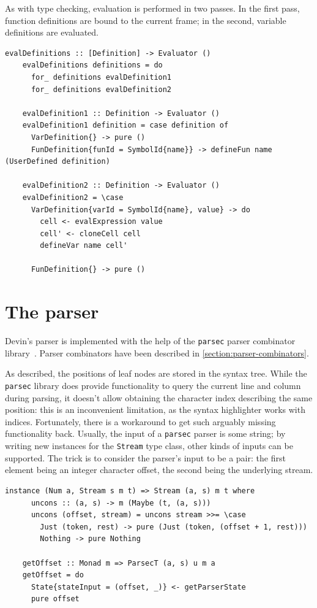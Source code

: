 \documentclass[UdineBachThesis,american,11pt]{PhdThesis}
\begin{document}
  As with type checking, evaluation is performed in two passes. In the first
  pass, function definitions are bound to the current frame; in the second,
  variable definitions are evaluated.

  \begin{Verbatim}[gobble=4,fontsize=\small]
    evalDefinitions :: [Definition] -> Evaluator ()
    evalDefinitions definitions = do
      for_ definitions evalDefinition1
      for_ definitions evalDefinition2

    evalDefinition1 :: Definition -> Evaluator ()
    evalDefinition1 definition = case definition of
      VarDefinition{} -> pure ()
      FunDefinition{funId = SymbolId{name}} -> defineFun name (UserDefined definition)

    evalDefinition2 :: Definition -> Evaluator ()
    evalDefinition2 = \case
      VarDefinition{varId = SymbolId{name}, value} -> do
        cell <- evalExpression value
        cell' <- cloneCell cell
        defineVar name cell'

      FunDefinition{} -> pure ()
  \end{Verbatim}

  \section{The parser}

  Devin's parser is implemented with the help of the \mbox{\texttt{parsec}}
  parser combinator library~\cite{parsec}. Parser combinators have been
  described in \autoref{section:parser-combinators}.

  As described, the positions of leaf nodes are stored in the syntax tree. While
  the \mbox{\texttt{parsec}} library does provide functionality to query the
  current line and column during parsing, it doesn't allow obtaining the
  character index describing the same position: this is an inconvenient
  limitation, as the syntax highlighter works with indices. Fortunately, there
  is a workaround to get such arguably missing functionality back. Usually, the
  input of a \mbox{\texttt{parsec}} parser is some string; by writing new
  instances for the \mbox{\texttt{Stream}} type class, other kinds of inputs can
  be supported. The trick is to consider the parser's input to be a pair: the
  first element being an integer character offset, the second being the
  underlying stream.

  \begin{Verbatim}[gobble=4,fontsize=\small]
    instance (Num a, Stream s m t) => Stream (a, s) m t where
      uncons :: (a, s) -> m (Maybe (t, (a, s)))
      uncons (offset, stream) = uncons stream >>= \case
        Just (token, rest) -> pure (Just (token, (offset + 1, rest)))
        Nothing -> pure Nothing

    getOffset :: Monad m => ParsecT (a, s) u m a
    getOffset = do
      State{stateInput = (offset, _)} <- getParserState
      pure offset
  \end{Verbatim}
\end{document}
